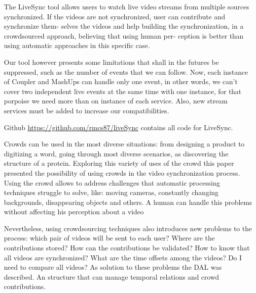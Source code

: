 The LiveSync tool allows users to watch live video streams from multiple sources synchronized. If the videos are not synchronized, user can contribute and synchronize them- selves the videos and help building the synchronization, in a crowdsourced approach, believing that using human per- ception is better than using automatic approaches in this specific case.

Our tool however presents some limitations that shall in the futures be suppressed, such as the number of events that we can follow. Now, each instance of Coupler and MashUps can handle only one event, in other words, we can’t cover two independent live events at the same time with one instance, for that porpoise we need more than on instance of each service. Also, new stream services must be added to increase our compatibilities.

Github \url{https://github.com/rmcs87/liveSync} contains all code for LiveSync.



Crowds can be used in the most diverse situations: from designing a product to digitizing a word, going through most diverse scenarios, as discovering the structure of a protein. Exploring this variety of uses of the crowd this paper presented the possibility of using crowds in the video synchronization process. Using the crowd allows to address challenges that automatic processing techniques struggle to solve, like: moving cameras, constantly changing backgrounds, disappearing objects and others. A human can handle this problems without affecting his perception about a video

Nevertheless, using crowdsourcing techniques also introduces new problems to the process: which pair of videos will be sent to each user? Where are the contributions stored? How can the contributions be validated? How to know that all videos are synchronized? What are the time offsets among the videos? Do I need to compare all videos? As solution to these problems the DAL was described. An structure that can manage temporal relations and crowd contributions.

